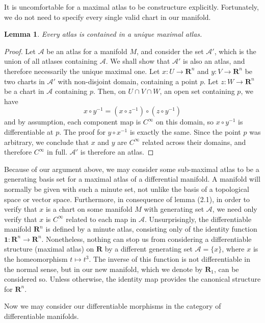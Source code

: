 \documentclass[12pt]{report}
\theoremstyle{plain}
\newtheorem{lemma}[theorem]{Lemma}
\theoremstyle{definition}
\begin{document}
It is uncomfortable for a maximal atlas to be constructure explicitly. Fortunately, we do not need to specify every single valid chart in our manifold.

\begin{lemma}
    Every atlas is contained in a unique maximal atlas.
\end{lemma}
\begin{proof}
Let $\mathcal{A}$ be an atlas for a manifold $M$, and consider the set $\mathcal{A}'$, which is the union of all atlases containing $\mathcal{A}$. We shall show that $\mathcal{A}'$ is also an atlas, and therefore necessarily the unique maximal one. Let $x:U \to \mathbf{R}^n$ and $y:V \to \mathbf{R}^n$ be two charts in $\mathcal{A}'$ with non-disjoint domain, containing a point $p$. Let $z:W \to \mathbf{R}^n$ be a chart in $\mathcal{A}$ containing $p$. Then, on $U \cap V \cap W$, an open set containing $p$, we have
%
\[ x \circ y^{-1} = (x \circ z^{-1}) \circ (z \circ y^{-1}) \]
%
and by assumption, each component map is $C^\infty$ on this domain, so $x \circ y^{-1}$ is differentiable at $p$. The proof for $y \circ x^{-1}$ is exactly the same. Since the point $p$ was arbitrary, we conclude that $x$ and $y$ are $C^\infty$ related across their domains, and therefore $C^\infty$ in full. $\mathcal{A}'$ is therefore an atlas.
\end{proof}

Because of our argument above, we may consider some sub-maximal atlas to be a generating basis set for a maximal atlas of a differential manifold. A manifold will normally be given with such a minute set, not unlike the basis of a topological space or vector space. Furthermore, in consequence of lemma (2.1), in order to verify that $x$ is a chart on some manifold $M$ with generating set $\mathcal{A}$, we need only verify that $x$ is $C^\infty$ related to each map in $\mathcal{A}$. Unsurprisingly, the differentiable manifold $\mathbf{R}^n$ is defined by a minute atlas, consisting only of the identity function $\mathbf{1}:\mathbf{R}^n \to \mathbf{R}^n$. Nonetheless, nothing can stop us from considering a differentiable structure (maximal atlas) on $\mathbf{R}$ by a different generating set $\mathcal{A} = \{ x \}$, where $x$ is the homeomorphism $t \mapsto t^3$. The inverse of this function is not differentiable in the normal sense, but in our new manifold, which we denote by $\mathbf{R}_1$, can be considered so. Unless otherwise, the identity map provides the canonical structure for $\mathbf{R}^n$.

Now we may consider our differentiable morphisms in the category of differentiable manifolds.
\end{document}
